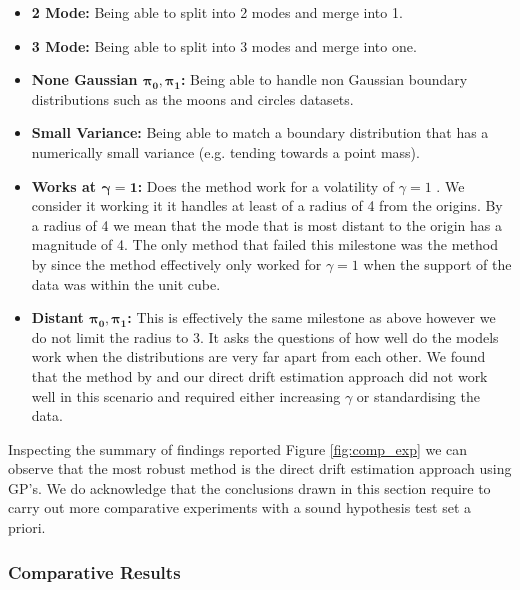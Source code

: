 \documentclass[a4paper,12pt,twoside,openright]{report}
\theoremstyle{definition}
\begin{document}
\begin{itemize}
    \item \textbf{ 2 Mode:} Being able to split into 2 modes and merge into 1.
    \item \textbf{ 3 Mode:} Being able to split into 3 modes and merge into one.
    \item \textbf{None Gaussian $\bm{\pi_0,\pi_1}$:} Being able to handle non Gaussian boundary distributions such as the moons and circles datasets. 
    \item \textbf{Small Variance:} Being able to match a boundary distribution that has a numerically small variance (e.g. tending towards a point mass).  
    \item \textbf{Works at $\bm{\gamma=1}$:} Does the method work for a volatility of $\gamma=1$ . We consider it working it it handles at least of a radius of 4 from the origins. By a radius of 4 we mean that the mode that is most distant to the origin has a magnitude of 4. The only method that failed this milestone was the method by \cite{pavon2018data} since the method effectively only worked for $\gamma=1$ when the support of the data was within the unit cube.
    \item \textbf{Distant $\bm{\pi_0, \pi_1}$:} This is effectively the same milestone as above however we do not limit the radius to 3. It asks the questions of how well do the models work when the distributions are very far apart from each other. We found that the method by \cite{pavon2018data} and our direct drift estimation approach did not work well in this scenario and required either increasing $\gamma$ or standardising the data.
\end{itemize}

Inspecting the summary of findings reported Figure \ref{fig:comp_exp} we can observe that the most robust method is the direct drift estimation approach using GP's.  We do acknowledge that the conclusions drawn in this section require to carry out more comparative experiments with a sound hypothesis test set a priori. 

\subsubsection{Comparative Results}
\end{document}
